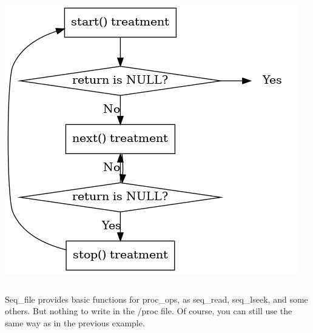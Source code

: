 \documentclass[11pt]{article}
\begin{document}
\begin{center}
\includegraphics[width=.9\linewidth]{img/seq_file.png}
\end{center}
\begin{center}
\begin{tabular}{}
\\
\end{tabular}
\end{center}
Seq\_file provides basic functions for proc\_ops, as seq\_read, seq\_lseek, and some others. But nothing to write in the /proc file. Of course, you can still use the same way as in the previous example.
\end{document}
